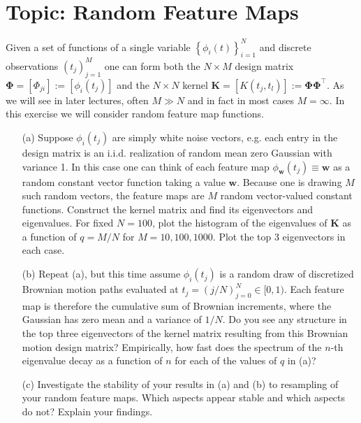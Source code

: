\documentclass[11pt]{article}
\theoremstyle{plain} %
\theoremstyle{remark}
\begin{document}
\begin{center}

  {}
\end{center}
\vspace{2em}

\tableofcontents

\section{Topic: Random Feature Maps}

Given a set of functions of a single variable
\(\left\{\phi_{i}(t)\right\}_{i=1}^{N}\) and discrete observations
\(\left(t_{j}\right)_{j=1}^{M}\) one can form both the \(N \times M\) design
matrix \(\boldsymbol{\Phi}=\left[\Phi_{j
i}\right]:=\left[\phi_{i}\left(t_{j}\right)\right]\) and the \(N \times N\)
kernel \(\mathbf{K}=\left[K\left(t_{j}, t_{l}\right)\right]:=\boldsymbol{\Phi} \boldsymbol{\Phi}^\top\). As
we will see in later lectures, often \(M \gg N\) and in fact in most cases
\(M=\infty\). In this exercise we will consider random feature map functions.

\begin{enumerate}
  \item[(a)] Suppose \(\phi_{i}\left(t_{j}\right)\) are simply white noise
  vectors, e.g. each entry in the design matrix is an i.i.d. realization of
  random mean zero Gaussian with variance 1. In this case one can think of each
  feature map \(\phi_{\mathbf{w}}\left(t_{j}\right)\equiv \mathbf{w}\)
  as a random constant vector function taking a value \(\mathbf{w}\). Because
  one is drawing \(M\) such random vectors, the feature maps are \(M\) random
  vector-valued constant functions. Construct the kernel matrix and find its
  eigenvectors and eigenvalues. For fixed \(N=100\), plot the histogram of the
  eigenvalues of \(\mathbf{K}\) as a function of \(q=M / N\) for
  \(M=10,100,1000\). Plot the top 3 eigenvectors in each case.
  \item[(b)] Repeat (a), but this time assume \(\phi_{i}\left(t_{j}\right)\) is
  a random draw of discretized Brownian motion paths evaluated at \(t_{j}=(j /
  N)_{j=0}^{N} \in[0,1)\). Each feature map is therefore the cumulative sum of
  Brownian increments, where the Gaussian has zero mean and a variance of \(1 /
  N\). Do you see any structure in the top three eigenvectors of the kernel
  matrix resulting from this Brownian motion design matrix? Empirically, how
  fast does the spectrum of the \(n\)-th eigenvalue decay as a function of \(n\)
  for each of the values of \(q\) in (a)?
  \item[(c)] Investigate the stability of your results in (a) and (b) to
  resampling of your random feature maps. Which aspects appear stable and which
  aspects do not? Explain your findings.
\end{enumerate}
\end{document}
